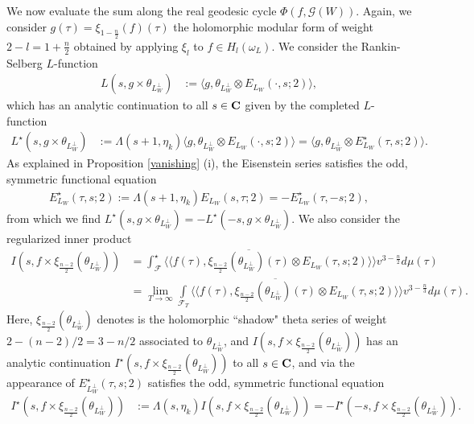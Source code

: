 \documentclass{amsart}
\theoremstyle{definition}
\theoremstyle{definition}
\theoremstyle{definition}
\begin{document}
We now evaluate the sum along the real geodesic cycle $\Phi(f, \mathcal{G}(W))$. Again, we consider $g(\tau) = \xi_{1-\frac{n}{2}}(f)(\tau)$ the 
holomorphic modular form of weight $2 - l = 1 + \frac{n}{2}$ obtained by applying $\xi_l$ to $f \in H_l(\omega_L)$. We consider the Rankin-Selberg $L$-function 
\begin{align*} L(s, g \times \theta_{L_W^{\perp}}) &:= \langle g, \theta_{L_W^{\perp}} \otimes E_{L_W}(\cdot, s; 2)  \rangle, \end{align*}
which has an analytic continuation to all $s \in {\bf{C}}$ given by the completed $L$-function
\begin{align*} L^{\star}(s, g \times \theta_{L_W^{\perp}}) &:= \Lambda(s+1, \eta_k)
\langle g, \theta_{L_W^{\perp}} \otimes E_{L_W}(\cdot, s; 2)  \rangle 
= \langle g, \theta_{L_W^{\perp}} \otimes E^{\star}_{L_W}(\tau, s; 2) \rangle. \end{align*}
As explained in Proposition \ref{vanishing} (i), the Eisenstein series satisfies the odd, symmetric functional equation 
\begin{align*} E^{\star}_{L_W}(\tau, s; 2) := \Lambda (s+1, \eta_k) E_{L_W}(s, \tau; 2) = - E^{\star}_{L_W}(\tau, -s; 2),\end{align*}
from which we find $L^{\star}(s, g \times \theta_{L_W^{\perp}}) = - L^{\star}(-s, g \times \theta_{L_W^{\perp}})$. We also consider the regularized inner product  
\begin{equation*}\begin{aligned} I(s, f \times \xi_{\frac{n-2}{2}}(\theta_{L_W^{\perp}})) &=
\int_{ \mathcal{F} }^{\star} \langle \langle f (\tau), \overline{ \xi_{\frac{n-2}{2}}(\theta_{ L_W^{\perp}   } )(\tau)} \otimes E_{L_W}(\tau, s; 2) \rangle \rangle v^{3 - \frac{n}{2}} d \mu (\tau) \\
&= \lim_{T \rightarrow \infty} \int\limits_{\mathcal{F}_T}  \langle \langle f (\tau), \overline{\xi_{\frac{n-2}{2}}(\theta_{L_W^{\perp}})(\tau)} \otimes E_{L_W}(\tau, s; 2) \rangle \rangle v^{3 - \frac{n}{3}} d \mu(\tau). 
\end{aligned}\end{equation*} 
Here, $\xi_{\frac{n-2}{2}}(\theta_{L_W^{\perp}})$ denotes is the holomorphic ``shadow" theta series of weight $2 - (n-2)/2 = 3-n/2$ associated to $\theta_{L_W^{\perp}}$,
and $I(s, f \times \xi_{\frac{n-2}{2}}(\theta_{L_W^{\perp}}))$ has an analytic continuation $I^{\star}(s, f \times \xi_{\frac{n-2}{2}}(\theta_{L_W^{\perp}}))$ to all $s \in {\bf{C}}$,
and via the appearance of $E^{\star}_{L_W^{\perp}}(\tau, s; 2)$ satisfies the odd, symmetric functional equation 
\begin{align}\label{IFE} I^{\star}(s, f \times \xi_{\frac{n-2}{2}}(\theta_{L_W^{\perp}})) 
&:= \Lambda(s, \eta_k) I(s, f \times \xi_{\frac{n-2}{2}}(\theta_{L_W^{\perp}})) = -I^{\star}(-s, f \times \xi_{\frac{n-2}{2}}(\theta_{L_W^{\perp}})).\end{align}
\end{document}
